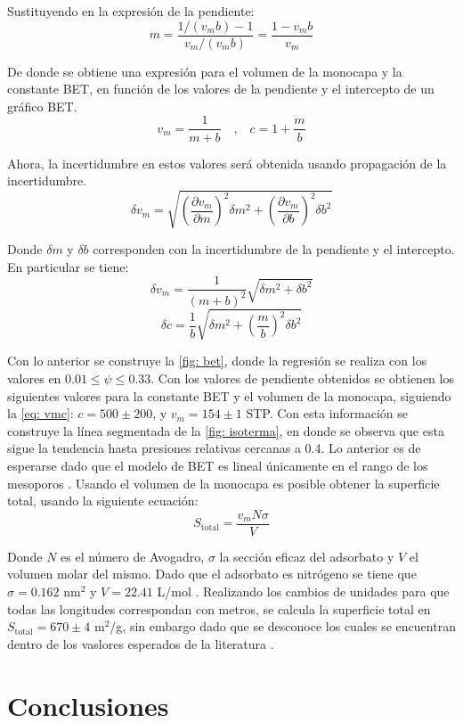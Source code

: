 \documentclass[fleqn,11pt]{SelfArx}
\begin{document}
	Sustituyendo en la expresi\'on de la pendiente:
	\begin{equation}
		m = \dfrac{1/(v_mb) - 1}{v_m/(v_mb)} = \dfrac{1-v_mb}{v_m}
	\end{equation}
	
	De donde se obtiene una expresi\'on para el volumen de la monocapa y la constante BET, en funci\'on de los valores de la pendiente y el intercepto de un gr\'afico BET.
	\begin{equation}\label{eq: vmc}
		v_m = \dfrac{1}{m+b}\quad\text{,}\quad
		c = 1 + \dfrac{m}{b}
	\end{equation}
	
	Ahora, la incertidumbre en estos valores ser\'a obtenida usando propagaci\'on de la incertidumbre.
	\begin{equation}
		\delta v_m =
		\sqrt{\left(\dfrac{\partial v_m}{\partial m}\right)^2\delta m^2 + 
		\left(\dfrac{\partial v_m}{\partial b}\right)^2\delta b^2}
	\end{equation}
	
	Donde $\delta m$ y $\delta b$ corresponden con la incertidumbre de la pendiente y el intercepto. En particular se tiene:
	\begin{equation}
		\delta v_m = \dfrac{1}{\left(m + b\right)^2}\sqrt{\delta m^2 + \delta b^2}
	\end{equation}
	\begin{equation}
		\delta c = \dfrac{1}{b}\sqrt{\delta m^2 + \left(\dfrac{m}{b}\right)^2\delta b^2}
	\end{equation}
	
	Con lo anterior se construye la \autoref{fig: bet}, donde la regresi\'on se realiza con los valores en $0.01\leq \psi \leq 0.33$. Con los valores de pendiente obtenidos se obtienen los siguientes valores para la constante BET y el volumen de la monocapa, siguiendo la \autoref{eq: vmc}: $c = 500 \pm 200$, y $v_m = 154 \pm 1$ STP. Con esta informaci\'on se construye la l\'inea segmentada de la \autoref{fig: isoterma}, en donde se observa que esta sigue la tendencia hasta presiones relativas cercanas a 0.4. Lo anterior es de esperarse dado que el modelo de BET es lineal \'unicamente en el rango de los mesoporos \cite{llewellyn2007bet}. Usando el volumen de la monocapa es posible obtener la superficie total, usando la siguiente ecuaci\'on:
	\begin{equation}
		S_{\text{total}} = \dfrac{v_mN\sigma}{V}
	\end{equation}
	
	Donde $N$ es el n\'umero de Avogadro, $\sigma$ la secci\'on eficaz del adsorbato y $V$ el volumen molar del mismo. Dado que el adsorbato es nitr\'ogeno se tiene que $\sigma = 0.162$ nm$^2$ y $V = 22.41$ L/mol \cite{ismail1992cross}. Realizando los cambios de unidades para que todas las longitudes correspondan con metros, se calcula la superficie total en $S_\text{total} = 670 \pm 4$ m$^2$/g, sin embargo dado que se desconoce los cuales se encuentran dentro de los vaslores esperados de la literatura \cite{vargas_legnoverde_giraldo_baaldella_moreno-pirajan_2010, galarneau2001true}.
	\section{Conclusiones}
	
	
	
	
	
\end{document}
